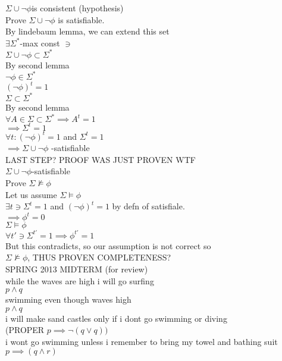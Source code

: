 \documentclass[12pt,oneside,notitlepage]{book}
\theoremstyle{definition}
\begin{document}
$\Sigma \cup { \neg \phi}$is consistent (hypothesis) \\
Prove $\Sigma \cup { \neg \phi}$ is satisfiable. \\
By lindebaum lemma, we can extend this set \\
$\exists \Sigma^*$-max const $\ni$  \\
$\Sigma \cup { \neg \phi } \subset \Sigma^*$ \\
By second lemma \\
$\neg \phi \in \Sigma^*$ \\
$(\neg \phi)^t = 1$ \\
$\Sigma \subset \Sigma^*$ \\
By second lemma \\
$\forall A \in \Sigma \subset \Sigma^* \implies A^t = 1$ \\
$\implies \Sigma^t = 1$ \\
$\forall t: (\neg \phi)^t =1 $ and $ \Sigma^t = 1$ \\
$\implies \Sigma \cup { \neg \phi}$ -satisfiable \\
LAST STEP? PROOF WAS JUST PROVEN WTF \\
$\Sigma \cup { \neg \phi}$-satisfiable \\
Prove $\Sigma \not \vDash \phi$ \\
Let us assume $\Sigma \vDash \phi$ \\
$\exists t  \ni \Sigma^t = 1 $ and $(\neg \phi)^t = 1$ by defn of satisfiale. \\
$\implies \phi^t = 0$ \\
$\Sigma \vDash \phi$ \\
$\forall t' \ni \Sigma^{t'} = 1 \implies \phi^{t'} = 1$  \\
But this contradicts, so our assumption is not correct so \\
$\Sigma \not \vDash \phi$, THUS PROVEN COMPLETENESS? \\


SPRING 2013 MIDTERM (for review) \\

while the waves are high i will go surfing \\
$p \land q$ \\
swimming even though waves high \\

$p \land q$ \\ 
i will make sand castles only if i dont go swimming or diving \\
(PROPER $p \implies \neg (q \lor q))$ \\
i wont go swimming unless i remember to bring my towel and bathing suit \\
$p \implies (q \land r)$ \\
\end{document}
